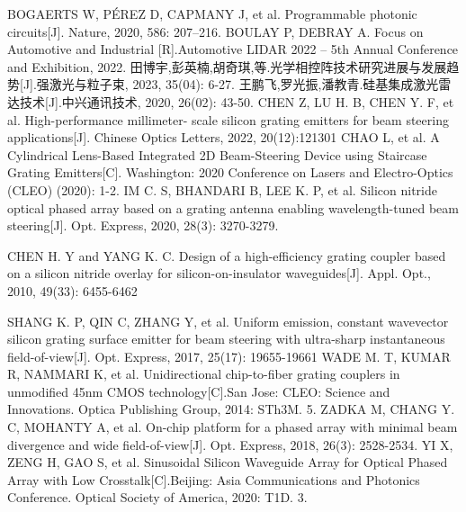 \documentclass[UTF8,a4paper,12pt]{ctexart}
\numberwithin{equation}{section}
\begin{document}
\renewcommand\refname{参\quad 考\quad 文\quad 献}
\begin{thebibliography}{1}
BOGAERTS W,  PÉREZ D, CAPMANY J, et al. Programmable photonic circuits[J]. Nature, 2020, 586: 207–216.
BOULAY P, DEBRAY A. Focus on Automotive and Industrial [R].Automotive LIDAR 2022 – 5th Annual Conference and Exhibition, 2022.
田博宇,彭英楠,胡奇琪,等.光学相控阵技术研究进展与发展趋势[J].强激光与粒子束, 2023, 35(04): 6-27.
王鹏飞,罗光振,潘教青.硅基集成激光雷达技术[J].中兴通讯技术, 2020, 26(02): 43-50.
 CHEN Z, LU H. B, CHEN Y. F, et al. High-performance millimeter-
scale silicon grating emitters for beam steering applications[J]. Chinese
Optics Letters, 2022,  20(12):121301
 CHAO L, et al. A Cylindrical Lens-Based Integrated 2D Beam-Steering Device using Staircase Grating Emitters[C]. Washington: 2020 Conference on Lasers and Electro-Optics (CLEO) (2020): 1-2.
 IM C. S,  BHANDARI B, LEE K. P, et al. Silicon nitride optical phased array based on a grating antenna enabling wavelength-tuned beam steering[J]. Opt. Express, 2020, 28(3): 3270-3279.

CHEN H. Y and  YANG K. C. Design of a high-efficiency grating coupler based on a silicon nitride overlay for silicon-on-insulator waveguides[J]. Appl. Opt., 2010, 49(33): 6455-6462

 SHANG K. P, QIN C,  ZHANG Y, et al. Uniform emission, constant wavevector silicon grating surface emitter for beam steering with ultra-sharp instantaneous field-of-view[J]. Opt. Express, 2017, 25(17):  19655-19661
 WADE M. T, KUMAR R, NAMMARI K, et al. Unidirectional chip-to-fiber grating couplers in unmodified 45nm CMOS technology[C].San Jose: CLEO: Science and Innovations. Optica Publishing Group, 2014: STh3M. 5.
 ZADKA M, CHANG Y. C, MOHANTY A, et al. On-chip platform for a phased array with minimal beam divergence and wide field-of-view[J]. Opt. Express, 2018, 26(3):  2528-2534.
 YI X, ZENG H,  GAO S, et al. Sinusoidal Silicon Waveguide Array for Optical Phased Array with Low Crosstalk[C].Beijing: Asia Communications and Photonics Conference. Optical Society of America, 2020: T1D. 3.



\end{thebibliography}
\end{document}
